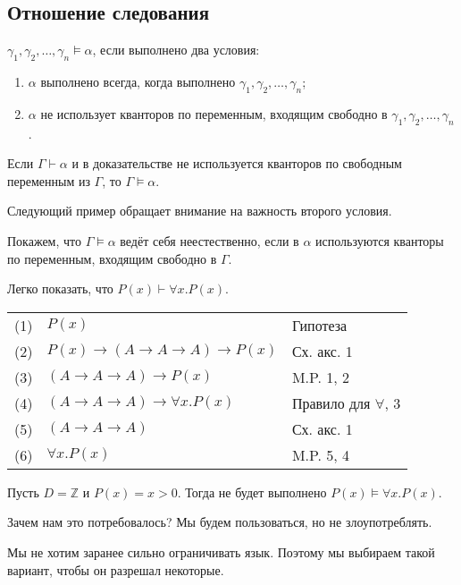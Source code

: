 \subsection{Отношение следования}

\begin{definition}[Следование]
    $\gamma_1,\gamma_2,\dots,\gamma_n\models\alpha$, если выполнено два условия:
\begin{enumerate}
\item $\alpha$ выполнено всегда, когда выполнено $\gamma_1,\gamma_2,\dots,\gamma_n$;
\item $\alpha$ не использует кванторов по переменным, входящим свободно в $\gamma_1,\gamma_2,\dots,\gamma_n$.
\end{enumerate}
\end{definition}

\begin{theorem}
    Если $\Gamma\vdash\alpha$ и в доказательстве не используется кванторов по свободным
переменным из $\Gamma$, то $\Gamma\models\alpha$.
\end{theorem}

Следующий пример обращает внимание на важность второго условия.
\begin{example}
    Покажем, что $\Gamma\models\alpha$ ведёт себя неестественно, если
в $\alpha$ используются кванторы по переменным, входящим свободно в $\Gamma$.

Легко показать, что $P(x)\vdash \forall x.P(x)$.

\begin{tabular}{lll}
(1) & $P(x)$ & Гипотеза \\
(2) & $P(x)\rightarrow (A\rightarrow A \rightarrow A) \rightarrow P(x)$ & Сх. акс. 1\\
(3) & $(A\rightarrow A \rightarrow A) \rightarrow P(x)$ & M.P. 1, 2\\
(4) & $(A\rightarrow A \rightarrow A) \rightarrow \forall x.P(x)$ & Правило для $\forall$, 3\\
(5) & $(A\rightarrow A \rightarrow A)$ & Сх. акс. 1\\
(6) & $\forall x.P(x)$ & M.P. 5, 4
\end{tabular}

Пусть $D = \mathbb{Z}$ и $P(x) = x > 0$. Тогда не будет выполнено $P(x)\models \forall x.P(x)$.
\end{example}

Зачем нам это потребовалось?  Мы будем пользоваться, но не злоупотреблять.

Мы не хотим заранее сильно ограничивать язык. Поэтому мы выбираем такой вариант, чтобы он разрешал некоторые.

